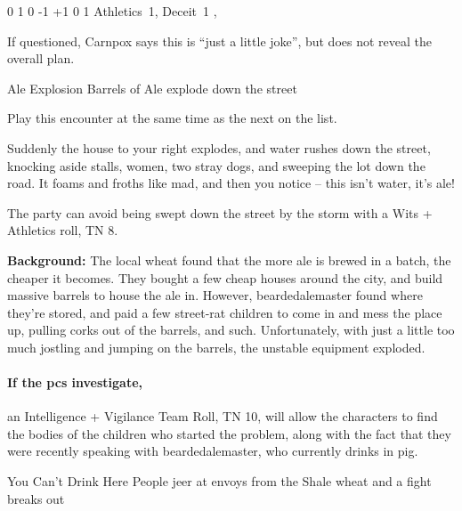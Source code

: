 
  {0}%
  {1}%
  {{0}%
  {-1}%
  {+1}}%
  {0}%
  {1}%
  {Athletics~1, Deceit~1}%
  {\longsword, \completeplate}%
  {\addtocounter{xpbonus}{-3}}

If questioned, Carnpox says this is ``just a little joke'', but does not reveal the overall plan.

{\squash Ale Explosion}%
{Barrels of Ale explode down the street}%

Play this encounter at the same time as the next on the list.

\begin{boxtext}

  Suddenly the house to your right explodes, and water rushes down the street, knocking aside stalls, women, two stray dogs, and sweeping the lot down the road.  It foams and froths like mad, and then you notice -- this isn't water, it's ale!

\end{boxtext}

The party can avoid being swept down the street by the storm with a Wits + Athletics roll, TN 8.

\textbf{Background:} The local \gls{wheat} found that the more ale is brewed in a batch, the cheaper it becomes.
They bought a few cheap houses around the city, and build massive barrels to house the ale in.
However, \gls{beardedalemaster} found where they're stored, and paid a few street-rat children to come in and mess the place up, pulling corks out of the barrels, and such.
Unfortunately, with just a little too much jostling and jumping on the barrels, the unstable equipment exploded.

\paragraph{If the \glspl{pc} investigate,}
an Intelligence + Vigilance Team Roll, TN 10, will allow the characters to find the bodies of the children who started the problem, along with the fact that they were recently speaking with \gls{beardedalemaster}, who currently drinks in \gls{pig}.%
\iftoggle{core}%
{\footnote{See the core rules, page \pageref{teamwork}, for Team Rolls.}}%
{}%

{You Can't Drink Here}%
{People jeer at envoys from the Shale \gls{wheat} and a fight breaks out}%

